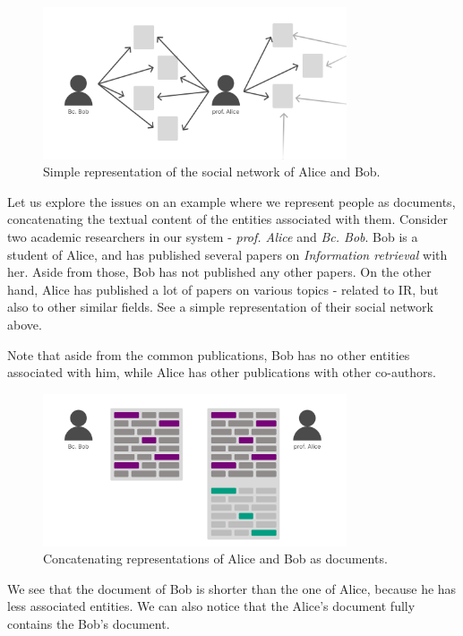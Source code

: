 \begin{figure}[ht!]
    \includegraphics[width=0.8\textwidth]{../img/bob-alice-soc-netw.png}
    \centering
    \caption{Simple representation of the social network of Alice and Bob.}
\end{figure}

Let us explore the issues on an example where we represent people as documents, concatenating the textual content of the entities associated with them.
Consider two academic researchers in our system - \textit{prof. Alice} and \textit{Bc. Bob}. 
Bob is a student of Alice, and has published several papers on \textit{Information retrieval} with her. Aside from those, Bob has not published any other papers.
On the other hand, Alice has published a lot of papers on various topics - related to IR, but also to other similar fields. 
See a simple representation of their social network above.

Note that aside from the common publications, Bob has no other entities associated with him, while Alice has other publications with other co-authors.

\begin{figure}[ht!]
    \includegraphics[width=0.8\textwidth]{../img/bob-alice-representations.png}
    \centering
    \caption{Concatenating representations of Alice and Bob as documents.}
\end{figure}

We see that the document of Bob is shorter than the one of Alice, because he has less associated entities. We can also notice that the Alice's document fully contains the Bob's document.
    
